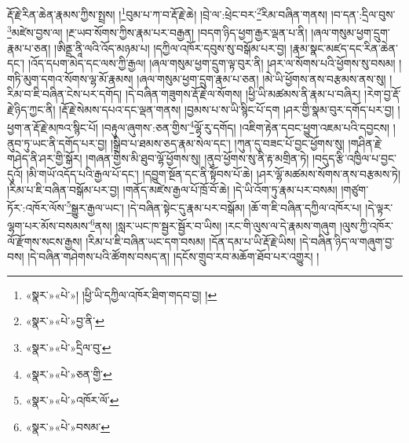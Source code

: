 རྡོ་རྗེ་རིན་ཆེན་རྣམས་ཀྱིས་སྤྲས། །\footnote{«སྣར་»«པེ་»། །ཕྱི་ཡི་དཀྱིལ་འཁོར་ཐིག་གདབ་བྱ། །}བུམ་པ་ཀ་བ་རྡོ་རྗེ་ཆེ། །བྲེ་ལ་:ཕྲེང་བར་\footnote{«སྣར་»«པེ་»བྱ་ནི་}རིམ་བཞིན་གནས། །བ་དན་:དྲིལ་བུས་\footnote{«སྣར་»«པེ་»དྲིལ་བུ་}མཛེས་བྱས་ལ། །རྔ་ཡབ་སོགས་ཀྱིས་རྣམ་པར་བརྒྱན། །བདག་ཉིད་ཕྱག་རྒྱར་ལྡན་པ་ནི། །ཞལ་གསུམ་ཕྱག་དྲུག་རྣམ་པ་ཅན། །ཨིནྡྲ་ནཱི་ལའི་འོད་མཉམ་པ། །དཀྱིལ་འཁོར་དབུས་སུ་བསྒོམ་པར་བྱ། །རྣམ་སྣང་མཛད་དང་རིན་ཆེན་དང་། །འོད་དཔག་མེད་དང་ལས་ཀྱི་རྒྱལ། །ཞལ་གསུམ་ཕྱག་དྲུག་ལྟ་བུར་ནི། །ཤར་ལ་སོགས་པའི་ཕྱོགས་སུ་བསམ། །གཏི་མུག་དགའ་སོགས་ལྷ་མོ་རྣམས། །ཞལ་གསུམ་ཕྱག་དྲུག་རྣམ་པ་ཅན། །མེ་ཡི་ཕྱོགས་ནས་བརྩམས་ནས་སུ། །རིམ་བ་ཇི་བཞིན་ངེས་པར་དགོད། །དེ་བཞིན་གཟུགས་རྡོ་རྗེ་ལ་སོགས། །ཕྱི་ཡི་མཚམས་ནི་རྣམ་པ་བཞིར། །རེག་བྱ་རྡོ་རྗེ་ཉིད་ཀྱང་ནི། །རྡོ་རྗེ་སེམས་དཔའ་དང་ལྡན་གནས། །བྱམས་པ་ས་ཡི་སྙིང་པོ་དག །ཤར་གྱི་སྣམ་བུར་དགོད་པར་བྱ། །ཕྱག་ན་རྡོ་རྗེ་མཁའ་སྙིང་པོ། །བརྟུལ་ཞུགས་:ཅན་གྱིས་\footnote{«སྣར་»«པེ་»ཅན་གྱི་}ལྷོ་རུ་དགོད། །འཇིག་རྟེན་དབང་ཕྱུག་འཇམ་པའི་དབྱངས། །ནུབ་ཏུ་ཡང་ནི་དགོད་པར་བྱ། །སྒྲིབ་པ་ཐམས་ཅད་རྣམ་སེལ་དང་། །ཀུན་དུ་བཟང་པོ་བྱང་ཕྱོགས་སུ། །གཤིན་རྗེ་གཤེད་ནི་ཤར་གྱི་སྒོར། །གཞན་གྱིས་མི་ཐུབ་ལྷོ་ཕྱོགས་སུ། །ནུབ་ཕྱོགས་སུ་ནི་རྟ་མགྲིན་ཏེ། །བདུད་རྩི་འཁྱིལ་པ་བྱང་དུའོ། །མི་གཡོ་འདོད་པའི་རྒྱལ་པོ་དང་། །དབྱུག་སྔོན་དང་ནི་སྟོབས་པོ་ཆེ། །ཤར་ལྷོ་མཚམས་སོགས་ནས་བརྩམས་ཏེ། །རིམ་པ་ཇི་བཞིན་བསྒོམ་པར་བྱ། །གནོད་མཛེས་རྒྱལ་པོ་ཁྲོ་བོ་ཆེ། །དེ་ཡི་འོག་ཏུ་རྣམ་པར་བསམ། །གཙུག་ཏོར་:འཁོར་ལོས་\footnote{«སྣར་»«པེ་»འཁོར་ལོ་}སྒྱུར་རྒྱལ་ཡང་། །དེ་བཞིན་སྟེང་དུ་རྣམ་པར་བསྒོམ། །ཆོ་ག་ཇི་བཞིན་དཀྱིལ་འཁོར་པ། །དེ་ལྟར་ལྷག་པར་མོས་བསམས་\footnote{«སྣར་»«པེ་»བསམ་}ནས། །སླར་ཡང་ཁ་སྦྱར་སྦྱོར་བ་ཡིས། །རང་གི་ལུས་ལ་དེ་རྣམས་གཞུག །ལུས་ཀྱི་འཁོར་ལོ་རྫོགས་སངས་རྒྱས། །རིམ་པ་ཇི་བཞིན་ཡང་དག་བསམ། །དོན་དམ་པ་ཡི་རྡོ་རྗེ་ཡིས། །དེ་བཞིན་ཉིད་ལ་གཞུག་བྱ་བས། །དེ་བཞིན་གཤེགས་པའི་ཚོགས་བསད་ན། །དངོས་གྲུབ་རབ་མཆོག་ཐོབ་པར་འགྱུར། །
